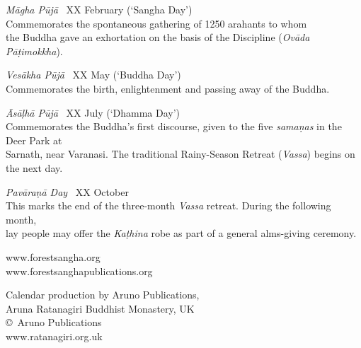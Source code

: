 {{%
\emph{Māgha Pūjā} \spacedcdot\ XX February (`Sangha Day')\\
Commemorates the spontaneous gathering of 1250 arahants to whom\\
the Buddha gave an exhortation on the basis of the Discipline (\emph{Ovāda Pāṭimokkha}).

\emph{Vesākha Pūjā} \spacedcdot\ XX May (`Buddha Day')\\
Commemorates the birth, enlightenment and passing away of the Buddha.

\emph{Āsāḷhā Pūjā} \spacedcdot\ XX July (`Dhamma Day')\\
Commemorates the Buddha's first discourse, given to the five \emph{samaṇas} in the Deer Park at\\
Sarnath, near Varanasi. The traditional Rainy-Season Retreat (\emph{Vassa}) begins on the next day.

\emph{Pavāraṇā Day} \spacedcdot\ XX October\\
This marks the end of the three-month \emph{Vassa} retreat. During the following month,\\
lay people may offer the \emph{Kaṭhina} robe as part of a general alms-giving ceremony.

\vspace{0.3\baselineskip}

www.forestsangha.org\\
www.forestsanghapublications.org

Calendar production by Aruno Publications,\\
Aruna Ratanagiri Buddhist Monastery, UK\\
\copyright\ Aruno Publications \the\year\\
www.ratanagiri.org.uk

\vspace{0.9\baselineskip}

}

}%


